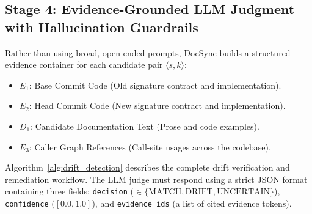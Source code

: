 \documentclass[12pt,onecolumn,draftclsnofoot]{IEEEtran}
\begin{document}
\subsection{Stage 4: Evidence-Grounded LLM Judgment with Hallucination Guardrails}
Rather than using broad, open-ended prompts, DocSync builds a structured evidence container for each candidate pair $\langle s, k \rangle$:
\begin{itemize}
    \item $E_1$: Base Commit Code (Old signature contract and implementation).
    \item $E_2$: Head Commit Code (New signature contract and implementation).
    \item $D_1$: Candidate Documentation Text (Prose and code examples).
    \item $E_3$: Caller Graph References (Call-site usages across the codebase).
\end{itemize}

Algorithm~\ref{alg:drift_detection} describes the complete drift verification and remediation workflow. The LLM judge must respond using a strict JSON format containing three fields: \texttt{decision} ($\in \{\text{MATCH}, \text{DRIFT}, \text{UNCERTAIN}\}$), \texttt{confidence} ($[0.0, 1.0]$), and \texttt{evidence\_ids} (a list of cited evidence tokens).
\end{document}
